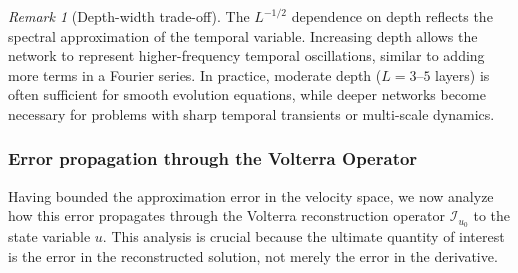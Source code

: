\documentclass[11pt,reqno]{amsart}
\theoremstyle{plain}
\theoremstyle{definition}
\theoremstyle{remark}
\newtheorem{remark}[theorem]{Remark}
\begin{document}
\begin{remark}[Depth-width trade-off]
The $L^{-1/2}$ dependence on depth reflects the spectral approximation of the temporal variable. Increasing depth allows the network to represent higher-frequency temporal oscillations, similar to adding more terms in a Fourier series. In practice, moderate depth ($L = 3$--$5$ layers) is often sufficient for smooth evolution equations, while deeper networks become necessary for problems with sharp temporal transients or multi-scale dynamics.
\end{remark}

\subsubsection{Error propagation through the Volterra Operator}

Having bounded the approximation error in the velocity space, we now analyze how this error propagates through the Volterra reconstruction operator $\mathcal{I}_{u_0}$ to the state variable $u$. This analysis is crucial because the ultimate quantity of interest is the error in the reconstructed solution, not merely the error in the derivative.
\end{document}
